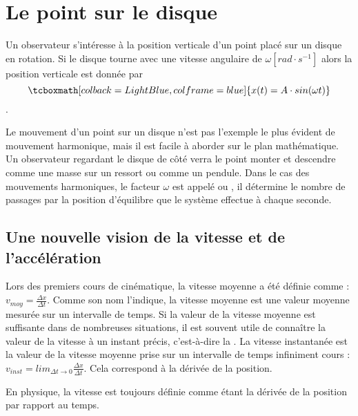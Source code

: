 \newpage

\section{Le point sur le disque}
Un observateur s'intéresse à la position verticale d'un point placé sur un disque en rotation. Si le disque tourne avec une vitesse angulaire de \(\omega [rad \cdot s^{-1}]\) alors la position verticale est donnée par
\begin{equation}
    \tcboxmath[colback=LightBlue,colframe=blue]
    {x(t)=A \cdot sin(\omega t)}
\end{equation}.

\begin{figure}[h!]
    \centering
    
\end{figure}


Le mouvement d'un point sur un disque n'est pas l'exemple le plus évident de mouvement harmonique, mais il est facile à aborder sur le plan mathématique. Un observateur regardant le disque de côté verra le point monter et descendre comme une masse sur un ressort ou comme un pendule.
Dans le cas des mouvements harmoniques, le facteur \(\omega\) est appelé  ou , il détermine le nombre de passages par la position d'équilibre que le système effectue à chaque seconde.

\newpage

\subsection{Une nouvelle vision de la vitesse et de l'accélération}
Lors des premiers cours de cinématique, la vitesse moyenne a été définie comme : \(v_{moy}=\frac{\Delta x}{\Delta t}\). Comme son nom l'indique, la vitesse moyenne est une valeur moyenne mesurée sur un intervalle de temps. Si la valeur de la vitesse moyenne est suffisante dans de nombreuses situations, il est souvent utile de connaître la valeur de la vitesse à un instant précis, c'est-à-dire la .
La vitesse instantanée est la valeur de la vitesse moyenne prise sur un intervalle de temps infiniment cours :\(v_{inst}= lim_{\Delta t \rightarrow 0} \frac{\Delta x}{\Delta t}\). Cela correspond à la dérivée de la position.

\begin{encadre}
    En physique, la vitesse est toujours définie comme étant la dérivée de la position par rapport au temps.
\end{encadre}

